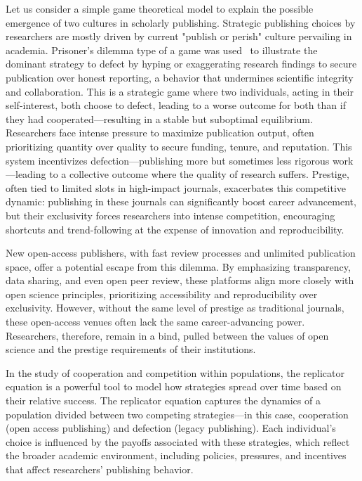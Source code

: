 \documentclass[amsfonts, amssymb, prl, superscriptaddress, notitlepage, twocolumn, nofootinbib]{revtex4-2}
\begin{document}
Let us consider a simple game theoretical model to explain the possible emergence of two cultures in scholarly publishing.
Strategic publishing choices by researchers are mostly driven by current "publish or perish" culture pervailing in academia. Prisoner’s dilemma type of a game was used~\cite{publish-and-flourish_2019,erren_analyzing_2016} to illustrate the dominant strategy to defect by hyping or exaggerating research findings to secure publication over honest reporting, a behavior that undermines scientific integrity and collaboration. This is a strategic game where two individuals, acting in their self-interest, both choose to defect, leading to a worse outcome for both than if they had cooperated—resulting in a stable but suboptimal equilibrium. Researchers face intense pressure to maximize publication output, often prioritizing quantity over quality to secure funding, tenure, and reputation. This system incentivizes defection—publishing more but sometimes less rigorous work—leading to a collective outcome where the quality of research suffers. Prestige, often tied to limited slots in high-impact journals, exacerbates this competitive dynamic: publishing in these journals can significantly boost career advancement, but their exclusivity forces researchers into intense competition, encouraging shortcuts and trend-following at the expense of innovation and reproducibility.

New open-access publishers, with fast review processes and unlimited publication space, offer a potential escape from this dilemma. By emphasizing transparency, data sharing, and even open peer review, these platforms align more closely with open science principles, prioritizing accessibility and reproducibility over exclusivity. However, without the same level of prestige as traditional journals, these open-access venues often lack the same career-advancing power. Researchers, therefore, remain in a bind, pulled between the values of open science and the prestige requirements of their institutions.

In the study of cooperation and competition within populations, the replicator equation is a powerful tool to model how strategies spread over time based on their relative success. The replicator equation captures the dynamics of a population divided between two competing strategies—in this case, cooperation (open access publishing) and defection (legacy publishing). Each individual’s choice is influenced by the payoffs associated with these strategies, which reflect the broader academic environment, including policies, pressures, and incentives that affect researchers' publishing behavior.
\end{document}
